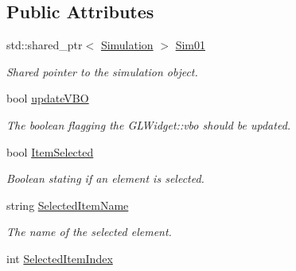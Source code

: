 \subsection*{Public Attributes}
\begin{DoxyCompactItemize}
\item 
\hypertarget{classGLWidget_a064d69f850c3822d5b1a80f2248e30c6}{}std\+::shared\+\_\+ptr$<$ \hyperlink{classSimulation}{Simulation} $>$ \hyperlink{classGLWidget_a064d69f850c3822d5b1a80f2248e30c6}{Sim01}\label{classGLWidget_a064d69f850c3822d5b1a80f2248e30c6}

\begin{DoxyCompactList}\small\item\em Shared pointer to the simulation object. \end{DoxyCompactList}\item 
\hypertarget{classGLWidget_a1b697f35b35a3bdd7132548daafe63c9}{}bool \hyperlink{classGLWidget_a1b697f35b35a3bdd7132548daafe63c9}{update\+V\+B\+O}\label{classGLWidget_a1b697f35b35a3bdd7132548daafe63c9}

\begin{DoxyCompactList}\small\item\em The boolean flagging the G\+L\+Widget\+::vbo should be updated. \end{DoxyCompactList}\item 
\hypertarget{classGLWidget_a37fa0d9c8bfb720f550365da0aefccc7}{}bool \hyperlink{classGLWidget_a37fa0d9c8bfb720f550365da0aefccc7}{Item\+Selected}\label{classGLWidget_a37fa0d9c8bfb720f550365da0aefccc7}

\begin{DoxyCompactList}\small\item\em Boolean stating if an element is selected. \end{DoxyCompactList}\item 
\hypertarget{classGLWidget_a67bf1bb7f19922f4ccb6728f339920e4}{}string \hyperlink{classGLWidget_a67bf1bb7f19922f4ccb6728f339920e4}{Selected\+Item\+Name}\label{classGLWidget_a67bf1bb7f19922f4ccb6728f339920e4}

\begin{DoxyCompactList}\small\item\em The name of the selected element. \end{DoxyCompactList}\item 
\hypertarget{classGLWidget_a908e8a53461c09eacf8d82d78d0a84d3}{}int \hyperlink{classGLWidget_a908e8a53461c09eacf8d82d78d0a84d3}{Selected\+Item\+Index}\label{classGLWidget_a908e8a53461c09eacf8d82d78d0a84d3}


\end{DoxyCompactItemize}
